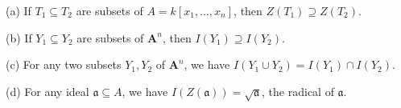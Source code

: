 (a) If $T_1 \subseteq T_2$ are subsets of $A = k[x_1,\ldots,x_n]$, then $Z(T_1) \supseteq Z(T_2)$.

(b) If $Y_1 \subseteq Y_2$ are subsets of $\mathbf{A}^n$, then $I(Y_1) \supseteq I(Y_2)$.

(c) For any two subsets $Y_1, Y_2$ of $\mathbf{A}^n$, we have $I(Y_1 \cup Y_2) = I(Y_1) \cap I(Y_2)$.

(d) For any ideal $\mathfrak{a} \subseteq A$, we have $I(Z(\mathfrak{a})) = \sqrt{\mathfrak{a}}$, the radical of $\mathfrak{a}$.
